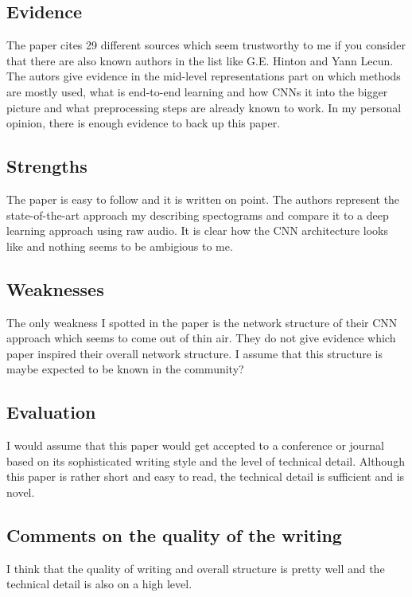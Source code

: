 \documentclass[a4paper]{article}
\begin{document}
\subsection{Evidence}

The paper cites 29 different sources which seem trustworthy to me if you consider that there are also known authors in the list like G.E. Hinton and Yann Lecun. The autors give evidence in the mid-level representations part on which methods are mostly used, what is end-to-end learning and how CNNs it into the bigger picture and what preprocessing steps are already known to work. In my personal opinion, there is enough evidence to back up this paper. 

\subsection{Strengths}

The paper is easy to follow and it is written on point. The authors represent the state-of-the-art approach my describing spectograms and compare it to a deep learning approach using raw audio. It is clear how the CNN architecture looks like and nothing seems to be ambigious to me.


\subsection{Weaknesses}

The only weakness I spotted in the paper is the network structure of their CNN approach which seems to come out of thin air. They do not give evidence which paper inspired their overall network structure. I assume that this structure is maybe expected to be known in the community?

\subsection{Evaluation}

I would assume that this paper would get accepted to a conference or journal based on its sophisticated writing style and the level of technical detail. Although this paper is rather short and easy to read, the technical detail is sufficient and is novel.

\subsection{Comments on the quality of the writing}

I think that the quality of writing and overall structure is pretty well and the technical detail is also on a high level.
\end{document}
